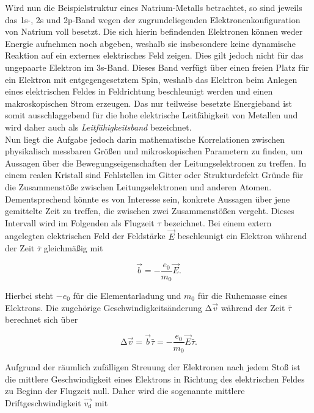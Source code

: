 \noindent Wird nun die Beispielstruktur eines Natrium-Metalls betrachtet, so sind jeweils das 1s-, 2s und 2p-Band wegen der 
zugrundeliegenden Elektronenkonfiguration von Natrium voll besetzt. Die sich hierin befindenden Elektronen können weder 
Energie aufnehmen noch abgeben, weshalb sie insbesondere keine dynamische Reaktion auf ein externes elektrisches Feld zeigen.
Dies gilt jedoch nicht für das ungepaarte Elektron im 3s-Band. Dieses Band verfügt über einen freien Platz für ein Elektron 
mit entgegengesetztem Spin, weshalb das Elektron beim Anlegen eines elektrischen Feldes in Feldrichtung beschleunigt werden 
und einen makroskopischen Strom erzeugen. Das nur teilweise besetzte Energieband ist somit ausschlaggebend für die hohe 
elektrische Leitfähigkeit von Metallen und wird daher auch als \emph{Leitfähigkeitsband} bezeichnet.\\

\noindent Nun liegt die Aufgabe jedoch darin mathematische Korrelationen zwischen physikalisch messbaren Größen und mikroskopischen 
Parametern zu finden, um Aussagen über die Bewegungseigenschaften der Leitungselektronen zu treffen. In einem realen Kristall 
sind Fehlstellen im Gitter oder Strukturdefekt Gründe für die Zusammenstöße zwischen Leitungselektronen und anderen Atomen.
Dementsprechend könnte es von Interesse sein, konkrete Aussagen über jene gemittelte Zeit zu treffen, die zwischen zwei 
Zusammenstößen vergeht. Dieses Intervall wird im Folgenden als Flugzeit $\tau$ bezeichnet. Bei einem extern angelegten elektrischen 
Feld der Feldstärke $\vec{E}$ beschleunigt ein Elektron während der Zeit $\bar{\tau}$ gleichmäßig mit 

\begin{equation*}
    \vec{b} = -\frac{e_0}{m_0}\vec{E}.
\end{equation*}

\noindent Hierbei steht $-e_0$ für die Elementarladung und $m_0$ für die Ruhemasse eines Elektrons. Die zugehörige
Geschwindigkeitsänderung $\increment{}\vec{v}$ während der Zeit $\bar{\tau}$ berechnet sich über 

\begin{equation}
\label{eqn:velocity}
    \increment{}\vec{v} = \vec{b}\bar{\tau} = -\frac{e_0}{m_0}\vec{E}\bar{\tau}.
\end{equation}

\noindent Aufgrund der räumlich zufälligen Streuung der Elektronen nach jedem Stoß ist die mittlere Geschwindigkeit 
eines Elektrons in Richtung des elektrischen Feldes zu Beginn der Flugzeit null. Daher wird die sogenannte mittlere 
Driftgeschwindigkeit $\vec{v_\text{d}}$ mit 

